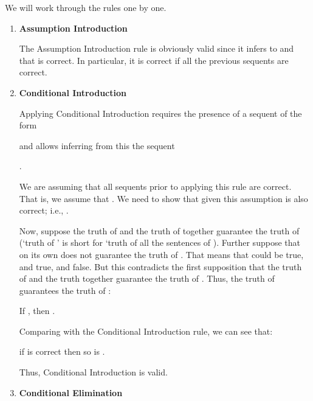 We will work through the rules one by one.
\begin{enumerate} \renewcommand{\labelenumi}{\arabic{enumi}.}
 \setlength{\labelwidth}{1.5em}
 \setlength{\leftmargin}{0em}

\item \textbf{Assumption Introduction}

The Assumption Introduction rule is obviously valid since it infers to  and that is correct. In particular, it is correct if all the 
previous sequents are correct.

\item \textbf{Conditional Introduction}

Applying Conditional Introduction requires the presence of a sequent of the form 


and allows inferring from this the sequent

. 

We are assuming that all sequents prior to applying this rule are correct.  
That is, we assume that . We need to show that given this assumption  is also correct; i.e., . 

Now, suppose the truth of \p{\Gamma} and the truth of  together  
guarantee the truth of  (`truth of \p{\Gamma}' is short for `truth of all 
the sentences of \p{\Gamma}).  Further suppose that \p{\Gamma} on its own does 
not guarantee the truth of .  That means that \p{\Gamma} 
could be true, and  true, and  false.  But this contradicts the 
first supposition that the truth of \p{\Gamma} and the truth  together 
guarantee the truth of . Thus, the truth of \p{\Gamma} guarantees the 
truth of :
\begin{center}
If , then .
\end{center}
Comparing with the Conditional Introduction rule, we can see that:

\begin{center}
 if  is correct then so is .  \end{center}
Thus, Conditional Introduction is valid.

\item \textbf{Conditional Elimination}


\end{enumerate}
